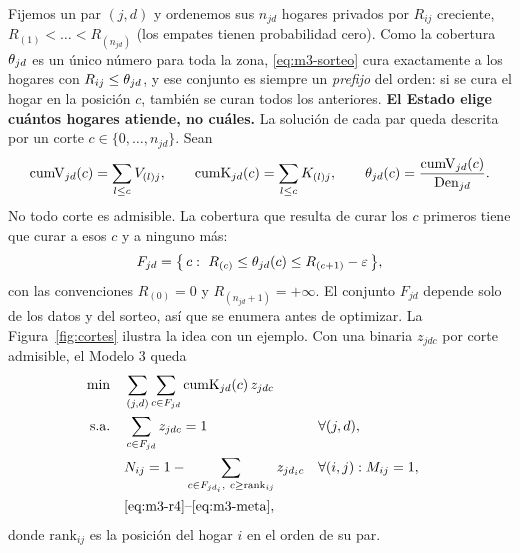 Fijemos un par $(j,d)$ y ordenemos sus $n_{jd}$ hogares privados por $R_{ij}$
creciente, $R_{(1)}<\dots<R_{(n_{jd})}$ (los empates tienen probabilidad cero).
Como la cobertura $\theta_{jd}$ es un único número para toda la zona,
\eqref{eq:m3-sorteo} cura exactamente a los hogares con $R_{ij}\le\theta_{jd}$, y
ese conjunto es siempre un \emph{prefijo} del orden: si se cura el hogar en la
posición $c$, también se curan todos los anteriores. \textbf{El Estado elige
cuántos hogares atiende, no cuáles.} La solución de cada par queda descrita por
un corte $c\in\{0,\dots,n_{jd}\}$. Sean
\[
\mathrm{cumV}_{jd}(c)=\sum_{l\le c}V_{(l)j},\qquad
\mathrm{cumK}_{jd}(c)=\sum_{l\le c}K_{(l)j},\qquad
\theta_{jd}(c)=\frac{\mathrm{cumV}_{jd}(c)}{\mathrm{Den}_{jd}}.
\]
No todo corte es admisible. La cobertura que resulta de curar los $c$ primeros
tiene que curar a esos $c$ y a ninguno más:
\begin{equation}\label{eq:m3-autoconsistente}
F_{jd}=\bigl\{\,c :\ R_{(c)}\le \theta_{jd}(c)\le R_{(c+1)}-\varepsilon\,\bigr\},
\end{equation}
con las convenciones $R_{(0)}=0$ y $R_{(n_{jd}+1)}=+\infty$. El conjunto
$F_{jd}$ depende solo de los datos y del sorteo, así que se enumera antes de
optimizar. La Figura~\ref{fig:cortes} ilustra la idea con un ejemplo. Con una
binaria $z_{jdc}$ por corte admisible, el Modelo 3 queda
\begin{align}
\min\quad & \sum_{(j,d)}\sum_{c\in F_{jd}} \mathrm{cumK}_{jd}(c)\, z_{jdc} \label{eq:m3c-obj}\\
\text{s.a.}\quad
& \sum_{c\in F_{jd}} z_{jdc}=1 && \forall (j,d), \label{eq:m3c-uno}\\
& N_{ij}=1-\sum_{c\in F_{jd_i},\ c\ge \mathrm{rank}_{ij}} z_{jd_ic}
  && \forall (i,j): M_{ij}=1, \label{eq:m3c-N}\\
& \eqref{eq:m3-r4}\text{--}\eqref{eq:m3-meta}, \notag
\end{align}
donde $\mathrm{rank}_{ij}$ es la posición del hogar $i$ en el orden de su par.

